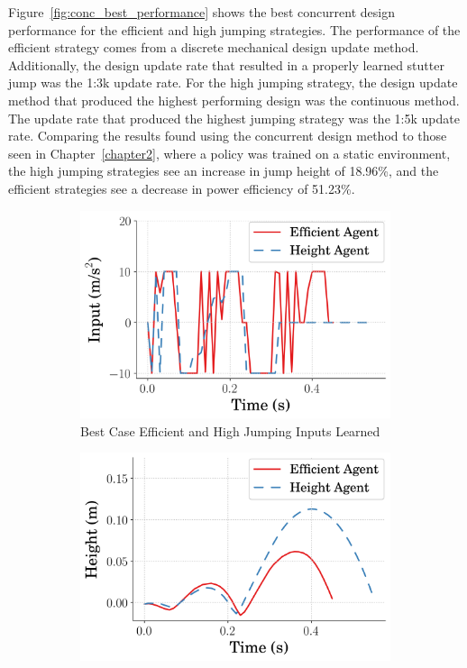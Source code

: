 Figure~\ref{fig:conc_best_performance} shows the best concurrent design performance for the efficient and high jumping strategies. The performance of the efficient  strategy comes from a discrete mechanical design update method. Additionally, the design update rate that resulted in a properly learned stutter jump was the 1:3k update rate. For the high jumping strategy, the design update method that produced the highest performing design was the continuous method. The update rate that produced the highest jumping strategy was the 1:5k update rate. Comparing the results found using the concurrent design method to those seen in Chapter~\ref{chapter2}, where a policy was trained on a static environment, the high jumping strategies see an increase in jump height of 18.96\%, and the efficient strategies see a decrease in power efficiency of 51.23\%.
%  
\begin{figure}[tb!]
  \centering
  \begin{subfigure}{.49\textwidth}
    \centering
    \includegraphics[width=\textwidth]{figures/Ch5/best_case/best_Stutter_Input_.png}  
    \caption{Best Case Efficient and High Jumping Inputs Learned}
    \label{fig:conc_best_input}
  \end{subfigure}
  \hfill
  \begin{subfigure}{.49\textwidth}
    \centering
    \includegraphics[width=\textwidth]{figures/Ch5/best_case/best_Stutter_RodPos_.png}  

\end{subfigure}
\end{figure}
